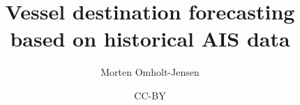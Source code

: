 \documentclass[american,titlepage,oneside]{ntnuthesis}
\title{Vessel destination forecasting based on historical AIS data}
\author{Morten Omholt-Jensen}
\date{CC-BY \ntnuthesisdate}
\begin{document}



\tableofcontents
\listoffigures
\listoftables
\lstlistoflistings

\printglossary[type=\acronymtype] %
\printglossary                    %

\newcommand{\paragraphheader}[1]{\paragraph{#1}\mbox{}\\}
\newcommand{\todo}[1]{{\color{olive}\textbf{TODO:}\color{olive}#1}} %

\setlength{\parindent}{4em}








\chapter*{\bibname}
\printbibliography[heading=none]

\appendix


\end{document}
